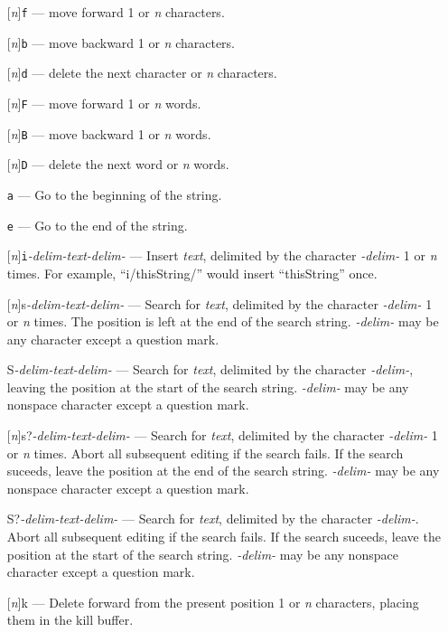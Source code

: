 \begin{itemize}
\item [] [{\em n}]{\tt f} --- move forward 1 or {\em n} characters.
\item [] [{\em n}]{\tt b} --- move backward 1 or {\em n} characters.
\item [] [{\em n}]{\tt d} --- delete the next character or {\em n} characters.
\item [] [{\em n}]{\tt F} --- move forward 1 or {\em n} words.
\item [] [{\em n}]{\tt B} --- move backward 1 or {\em n} words.
\item [] [{\em n}]{\tt D} --- delete the next word or {\em n} words.
\item [] {\tt a} --- Go to the beginning of the string.
\item [] {\tt e} --- Go to the end of the string.
\item [] [{\em n}]{\tt i}{\em -delim-}{\em text}{\em -delim-} --- Insert {\em text}, delimited
        by the character {\em -delim-} 1 or {\em n} times.  For example, ``i/thisString/'' would insert
        ``thisString'' once.
\item [] [{\em n}]s{\em -delim-}{\em text}{\em -delim-} --- Search for {\em text},  delimited
        by the character {\em -delim-} 1 or {\em n} times.  The position is left at the end
        of the search string.  {\em -delim-} may be any character except a question mark.
\item [] S{\em -delim-}{\em text}{\em -delim-} --- Search for {\em text},  delimited
        by the character {\em -delim-}, leaving the position at the start of the
        search string. {\em -delim-} may be any nonspace character except a question mark.
\item [] [{\em n}]s?{\em -delim-}{\em text}{\em -delim-} --- Search for {\em text},  delimited
         by the character {\em -delim-} 1 or {\em n} times.   Abort all subsequent editing
        if the search fails.  If the search suceeds, leave the position at the end of the
        search string. {\em -delim-} may be any nonspace character except a question mark.
\item [] S?{\em -delim-}{\em text}{\em -delim-} --- Search for {\em text},  delimited
         by the character {\em -delim-}.   Abort all subsequent editing
        if the search fails.  If the search suceeds, leave the position at the start of the
        search string. {\em -delim-} may be any nonspace character except a question mark.
\item [] [{\em n}]k --- Delete forward from the present position 1 or {\em n} characters, placing them in the kill buffer.

\end{itemize}
